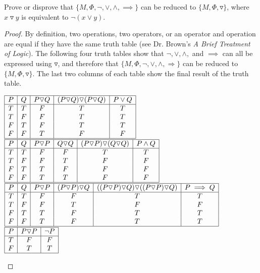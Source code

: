 \documentclass[12pt]{article}
\newenvironment{problem}[2][Problem]{\begin{trivlist}
\item[\hskip \labelsep {\bfseries #1}\hskip \labelsep {\bfseries #2.}]}{\end{trivlist}}
\begin{document}
\newpage
\begin{problem}[Logic Exercise]{6}
Prove or disprove that $\{M,\Phi,\neg,\lor,\land,\implies\}$ can be reduced to $\{M,\Phi,\triangledown\}$, where $x\triangledown y$ is equivalent to $\neg(x\lor y)$.
\end{problem}
\begin{proof}
By definition, two operations, two operators, or an operator and operation are equal if they have the same truth table (see Dr. Brown's \textit{A Brief Treatment of Logic}). The following four truth tables show that $\neg,\lor,\land,$ and $\implies$ can all be expressed using $\triangledown$, and therefore that $\{M,\Phi,\neg,\lor,\land,\Rightarrow\}$ can be reduced to $\{M,\Phi,\triangledown\}$. The last two columns of each table show the final result of the truth table.
\begin{center}
$\begin{array}{|c|c|c|c|c|} \hline P & Q & P \triangledown Q & (P \triangledown Q) \triangledown (P \triangledown Q) & P \lor Q \\
\hline
T & T & F & T & T \\
T & F & F & T & T \\
F & T & F & T & T \\
F & F & T & F & F \\\hline
\end{array}$
\ 
$\begin{array}{|c|c|c|c|c|c|} \hline P & Q & P \triangledown P & Q \triangledown Q &(P \triangledown P) \triangledown (Q \triangledown Q) & P \land Q \\
\hline
T & T & F & F & T & T \\
T & F & F & T & F & F \\
F & T & T & F & F & F \\
F & F & T & T & F & F \\\hline
\end{array}$
\newline
\vspace*{0.5in}
\newline
$\begin{array}{|c|c|c|c|c|c|} \hline P & Q & P \triangledown P & (P \triangledown P) \triangledown Q & ((P \triangledown P) \triangledown Q) \triangledown ((P \triangledown P) \triangledown Q) & P \implies Q \\
\hline
T & T & F & F & T & T \\
T & F & F & T & F & F \\
F & T & T & F & T & T \\
F & F & T & F & T & T \\\hline
\end{array}$
\hspace{0.2in}
$\begin{array}{|c|c|c|} \hline P & P \triangledown P & \neg P \\
\hline
T & F & F \\
F & T & T \\\hline
\end{array}$
\end{center}
\end{proof}
\end{document}
